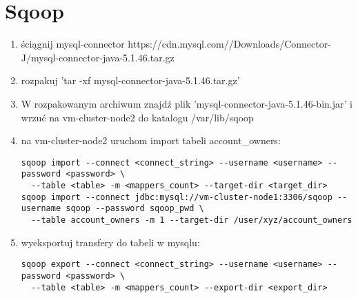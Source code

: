 \documentclass{article}
\begin{document}
\section*{Sqoop}

\begin{enumerate}
\item ściągnij mysql-connector https://cdn.mysql.com//Downloads/Connector-J/mysql-connector-java-5.1.46.tar.gz
\item rozpakuj 'tar -xf mysql-connector-java-5.1.46.tar.gz'
\item W rozpakowanym archiwum znajdź plik 'mysql-connector-java-5.1.46-bin.jar' i wrzuć na vm-cluster-node2 do katalogu /var/lib/sqoop
\item na vm-cluster-node2 uruchom import tabeli account\_owners:
\begin{lstlisting}
sqoop import --connect <connect_string> --username <username> --password <password> \
  --table <table> -m <mappers_count> --target-dir <target_dir>
sqoop import --connect jdbc:mysql://vm-cluster-node1:3306/sqoop --username sqoop --password sqoop_pwd \
  --table account_owners -m 1 --target-dir /user/xyz/account_owners
\end{lstlisting}
\item wyeksportuj transfery do tabeli w mysqlu:
\begin{lstlisting}
sqoop export --connect <connect_string> --username <username> --password <password> \
  --table <table> -m <mappers_count> --export-dir <export_dir>
\end{lstlisting}
\end{enumerate}
\end{document}

